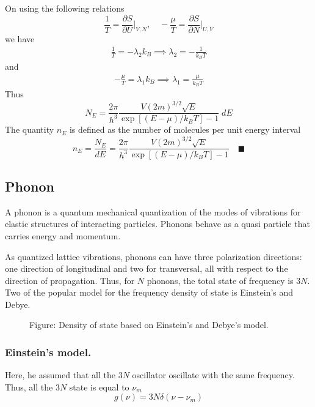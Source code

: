 \documentclass[../../../Main.tex]{subfiles}
\begin{document}
On using the following relations
\begin{equation*}
    \frac{1}{T}=\frac{\partial S}{\partial U}\bigg|_{V,N},\quad -\frac{\mu}{T}=\frac{\partial S}{\partial N}\bigg|_{U,V}
\end{equation*}
we have 
\begin{align*}
    \frac{1}{T}=-\lambda_2k_B\implies
    \lambda_2=-\frac{1}{k_BT}
\end{align*}
and
\begin{align*}
    -\frac{\mu}{T}=\lambda_1k_B\implies
    \lambda_1=\frac{\mu}{k_BT}
\end{align*}
Thus
\begin{equation*}
    N_E=\frac{2\pi}{h^3} \frac{V (2m)^{3/2}\sqrt{E}}{\exp\left[(E-\mu)/k_BT\right]-1} \;dE
\end{equation*}
The quantity $n_E$ is defined as the number of molecules per unit energy interval
\begin{equation*}
    n_E=\frac{N_E}{dE}=\frac{2\pi}{h^3} \frac{V (2m)^{3/2}\sqrt{E}}{\exp\left[(E-\mu)/k_BT\right]-1} \quad\blacksquare
\end{equation*}
 
\subsection*{Phonon}
A phonon is a quantum mechanical quantization of the modes of vibrations for elastic structures of interacting particles. Phonons behave as a quasi particle that carries energy and momentum. 

As quantized lattice vibrations, phonons can have three polarization directions: one direction of longitudinal and two for transversal, all with respect to the direction of propagation. Thus, for $N$ phonons, the total state of frequency is $3N$. Two of the popular model for the frequency density of state is Einstein's and Debye.
\begin{figure*}
    \centering
    \caption*{Figure: Density of state based on Einstein's and Debye's model.}
\end{figure*}

\subsubsection*{Einstein's model.} Here, he assumed that all the $3N$ oscillator oscillate with the same frequency. Thus, all the $3N$ state is equal to $\nu_m$
\begin{equation*}
    g(\nu)=3N\delta(\nu-\nu_m)
\end{equation*}
\end{document}
